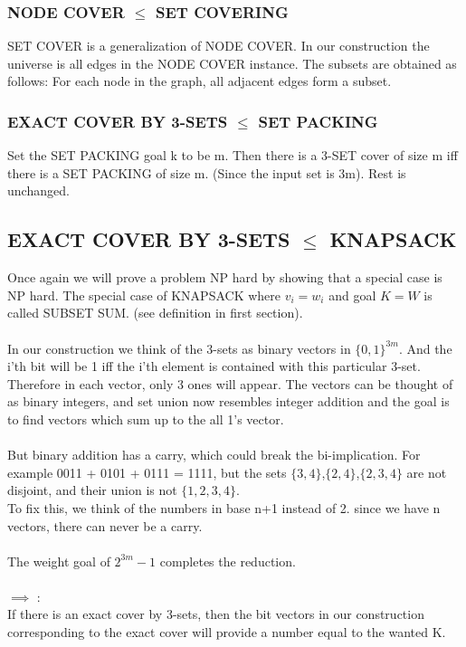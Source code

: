 \subsubsection{NODE COVER $\le$ 
SET COVERING}
SET COVER is a generalization of NODE COVER. In our construction the universe is all edges in the NODE COVER instance. The subsets are obtained as follows: For each node in the graph, all adjacent edges form a subset.
\subsubsection{EXACT COVER BY 3-SETS $\le$
SET PACKING}
Set the SET PACKING goal k to be m. Then there is a 3-SET cover of size m iff there is a SET PACKING of size m. (Since the input set is 3m). Rest is unchanged.  
\newpage
\subsection{EXACT COVER BY 3-SETS $\le$ KNAPSACK}
Once again we will prove a problem NP hard by showing that a special case is NP hard. The special case of KNAPSACK where $v_i = w_i$ and goal $K = W$ is called SUBSET SUM. (see definition in first section).\\\\
In our construction we think of the 3-sets as binary vectors in $\{0,1\}^{3m}$. And the i'th bit will be 1 iff the i'th element is contained with this particular 3-set. Therefore in each vector, only 3 ones will appear. The vectors can be thought of as binary integers, and set union now resembles integer addition and the goal is to find vectors which sum up to the all 1's vector. \\\\
But binary addition has a carry, which could break the bi-implication. For example 0011 + 0101 + 0111 = 1111, but the sets $\{3,4\}$,$\{2,4\}$,$\{2,3,4\}$ are not disjoint, and their union is not $\{1,2,3,4\}$.\\
To fix this, we think of the numbers in base n+1 instead of 2. since we have n vectors, there can never be a carry.\\\\
The weight goal of $2^{3m}-1$ completes the reduction.\\\\
$\implies$ :\\ If there is an exact cover by 3-sets, then the bit vectors in our construction corresponding to the exact cover will provide a number equal to the wanted K.\\\\
